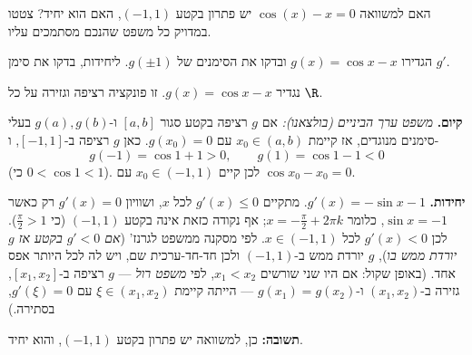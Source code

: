 
\begin{question}
האם למשוואה $\cos(x)-x=0$ יש פתרון בקטע $(-1,1)$, האם הוא יחיד? צטטו במדויק כל משפט שהנכם מסתמכים עליו.
\end{question}

\begin{hint}
הגדירו $g(x)=\cos x-x$ ובדקו את הסימנים של $g(\pm1)$. ליחידות, בדקו את סימן $g'$.
\end{hint}

\begin{solution}
נגדיר $g(x)=\cos x-x$. זו פונקציה רציפה וגזירה על כל $\R$.

\textbf{קיום.} \emph{משפט ערך הביניים (בולצאנו):} אם $g$ רציפה בקטע סגור $[a,b]$ ו-$g(a),g(b)$ בעלי סימנים מנוגדים, אז קיימת $x_0\in(a,b)$ עם $g(x_0)=0$.
כאן $g$ רציפה ב-$[-1,1]$, ו-
\[
g(-1)=\cos1+1>0,\qquad g(1)=\cos1-1<0
\]
(כי $0<\cos1<1$). לכן קיים $x_0\in(-1,1)$ עם $\cos x_0-x_0=0$.

\textbf{יחידות.} $g'(x)=-\sin x-1$. מתקיים $g'(x)\le0$ לכל $x$, ושוויון $g'(x)=0$ רק כאשר $\sin x=-1$, כלומר $x=-\frac\pi2+2\pi k$; אף נקודה כזאת אינה בקטע $(-1,1)$ (כי $\frac\pi2>1$). לכן $g'(x)<0$ לכל $x\in(-1,1)$.
לפי מסקנה ממשפט לגרנז' (\emph{אם $g'<0$ בקטע אז $g$ יורדת ממש בו}), $g$ יורדת ממש ב-$(-1,1)$ ולכן חד-חד-ערכית שם, ויש לה לכל היותר אפס אחד.
(באופן שקול: אם היו שני שורשים $x_1<x_2$, לפי \emph{משפט רול} — $g$ רציפה ב-$[x_1,x_2]$, גזירה ב-$(x_1,x_2)$ ו-$g(x_1)=g(x_2)$ — הייתה קיימת $\xi\in(x_1,x_2)$ עם $g'(\xi)=0$, בסתירה.)

\textbf{תשובה:} כן, למשוואה יש פתרון בקטע $(-1,1)$, והוא יחיד.
\end{solution}
